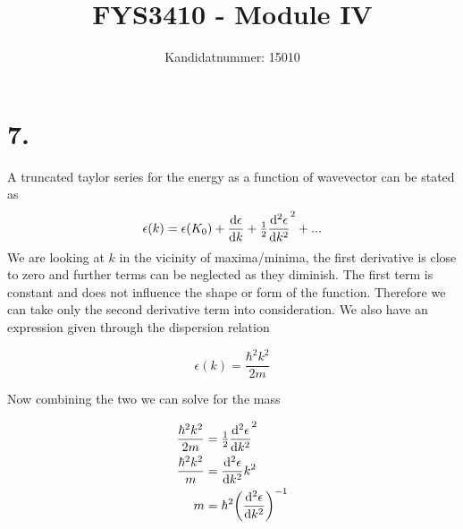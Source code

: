 \documentclass{article}
\author{Kandidatnummer: 15010}
\title{FYS3410 - Module IV}
\begin{document}
\maketitle

\section*{7. }
A truncated taylor series for the energy as a function of wavevector can be stated as
$$ \epsilon(k) = \epsilon(K_0) + \dv{\epsilon}{k} (k-k_0) + \tfrac{1}{2}\dv[2]{\epsilon}{k} (k-k_0)^2 + ...$$
We are looking at $k$ in the vicinity of maxima/minima, the first derivative is close to zero and further terms can be neglected as they diminish.
The first term is constant and does not influence the shape or form of the function.
Therefore we can take only the second derivative term into consideration.
We also have an expression given through the dispersion relation

$$ \epsilon(k) = \frac{\hbar^2k^2}{2m} $$

Now combining the two we can solve for the mass

\begin{align*}
	\frac{\hbar^2k^2}{2m} &= \tfrac{1}{2}\dv[2]{\epsilon}{k} (k-k_0)^2\\
	\frac{\hbar^2k^2}{m} &= \dv[2]{\epsilon}{k}k^2\\
	m &= \hbar^2\qty(\dv[2]{\epsilon}{k})^{-1}
\end{align*}
\end{document}
